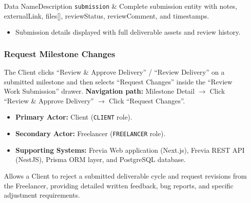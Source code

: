 \begin{specdatatable}{Data Name}{Description}
      \texttt{submission} & Complete submission entity with notes, externalLink, files[], reviewStatus, reviewComment, and timestamps.\\ \hline
\end{specdatatable}

\begin{itemize}[leftmargin=1.6em,topsep=3pt,itemsep=2pt,parsep=0pt,label=$\bullet$]
      \item Submission details displayed with full deliverable assets and review history.
\end{itemize}

\subsubsection{ Request Milestone Changes}

The Client clicks ``Review \& Approve Delivery'' / ``Review Delivery'' on a submitted milestone and then selects ``Request Changes'' inside the ``Review Work Submission'' drawer.\newline
\textbf{Navigation path:} Milestone Detail $\rightarrow$ Click ``Review \& Approve Delivery'' $\rightarrow$ Click ``Request Changes''.


\begin{itemize}[leftmargin=1.6em,topsep=3pt,itemsep=2pt,parsep=0pt,label=$\bullet$]
      \item \textbf{Primary Actor:} Client (\texttt{CLIENT} role).
      \item \textbf{Secondary Actor:} Freelancer (\texttt{FREELANCER} role).
      \item \textbf{Supporting Systems:} Frevia Web application (Next.js), Frevia REST API (NestJS), Prisma ORM layer, and PostgreSQL database.
\end{itemize}

\noindent Allows a Client to reject a submitted deliverable cycle and request revisions from the Freelancer, providing detailed written feedback, bug reports, and specific adjustment requirements.

